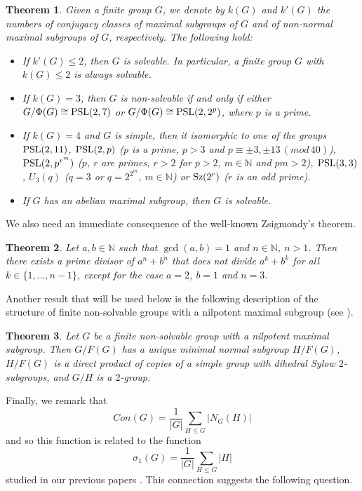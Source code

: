 \documentclass[12pt]{article}
\newtheorem{thmy}{Theorem}
\newcommand{\0}{{\leqno}}
\begin{document}
\begin{thmy}
Given a finite group $G$, we denote by $k(G)$ and $k'(G)$ the numbers of conjugacy classes of maximal subgroups of $G$ and of non-normal maximal subgroups of $G$, respectively. The following hold:
\begin{itemize}
\item[{\rm a)}] If $k'(G)\leq 2$, then $G$ is solvable. In particular, a finite group $G$ with $k(G)\leq 2$ is always solvable.
\item[{\rm b)}] If $k(G)=3$, then $G$ is non-solvable if and only if either $G/\Phi(G)\cong {\rm PSL}(2,7)$ or $G/\Phi(G)\cong {\rm PSL}(2,2^p)$, where $p$ is a prime.
\item[{\rm c)}] If $k(G)=4$ and $G$ is simple, then it isomorphic to one of the groups ${\rm PSL}(2,11)$, ${\rm PSL}(2,p)$ {\rm(}$p$ is a prime,
$p>3$ and $p\equiv \pm 3, \pm 13\, (mod\, 40)${\rm)}, ${\rm PSL}(2,p^{r^m})$ {\rm(}$p$, $r$ are primes, $r>2$ for $p>2$, $m\in\mathbb{N}$ and $pm>2${\rm)}, ${\rm PSL}(3,3)$, $U_3(q)$ {\rm(}$q=3$ or $q=2^{2^m}$, $m\in\mathbb{N}${\rm)} or ${\rm Sz}(2^r)$ {\rm(}$r$ is an odd prime{\rm)}.
\item[{\rm d)}] If $G$ has an abelian maximal subgroup, then $G$ is solvable.
\end{itemize}
\end{thmy}

We also need an immediate consequence of the well-known Zsigmondy's theorem.

\begin{thmy}
Let $a,b\in\mathbb{N}$ such that $\gcd(a, b)=1$ and $n\in\mathbb{N}$, $n>1$. Then there exists a prime divisor of $a^n+b^n$ that does not divide $a^k+b^k$ for all $k\in\{1, \dots, n-1\}$, except for the case $a=2$, $b=1$ and $n=3$.
\end{thmy}

Another result that will be used below is the following description of the structure of finite non-solvable groups with a nilpotent maximal subgroup (see \cite{1}).

\begin{thmy}
Let $G$ be a finite non-solvable group with a nilpotent maximal subgroup. Then $G/F(G)$ has a unique minimal normal subgroup $H/F(G)$, $H/F(G)$ is a direct product of copies of a simple group with dihedral Sylow $2$-subgroups, and $G/H$ is a $2$-group.
\end{thmy}

Finally, we remark that 
\begin{equation}
Con(G)=\frac{1}{|G|}\sum_{H\leq G}|N_G(H)|\nonumber
\end{equation}and so this function is related to the function
\begin{equation}
\sigma_1(G)=\frac{1}{|G|}\sum_{H\leq G}|H|\nonumber
\end{equation}studied in our previous papers \cite{14,17}. This connection suggests the following question.
\bigskip
\end{document}
